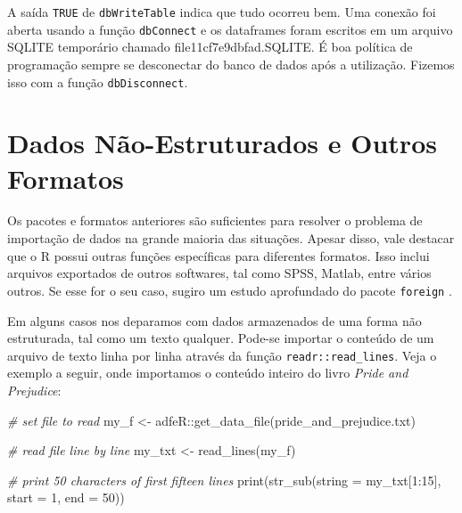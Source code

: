 \documentclass[
  11pt,
]{book}
\newenvironment{Shaded}{\begin{snugshade}}{\end{snugshade}}
\newcommand{\AttributeTok}[1]{\textcolor[rgb]{0.61,0.61,0.61}{#1}}
\newcommand{\CommentTok}[1]{\textcolor[rgb]{0.37,0.37,0.37}{\textit{#1}}}
\newcommand{\DecValTok}[1]{\textcolor[rgb]{0.06,0.06,0.06}{#1}}
\newcommand{\FunctionTok}[1]{\textcolor[rgb]{0,0,0}{#1}}
\newcommand{\NormalTok}[1]{#1}
\newcommand{\OtherTok}[1]{\textcolor[rgb]{0.37,0.37,0.37}{#1}}
\newcommand{\SpecialCharTok}[1]{\textcolor[rgb]{0,0,0}{#1}}
\newcommand{\StringTok}[1]{\textcolor[rgb]{0.5,0.5,0.5}{#1}}
\begin{document}
A saída \texttt{TRUE} de \texttt{dbWriteTable} indica que tudo ocorreu bem. Uma conexão foi aberta usando a função \texttt{dbConnect} e os dataframes foram escritos em um arquivo SQLITE temporário chamado file11cf7e9dbfad.SQLITE. É boa política de programação sempre se desconectar do banco de dados após a utilização. Fizemos isso com a função \texttt{dbDisconnect}.   

\hypertarget{dados-nuxe3o-estruturados-e-outros-formatos}{%
\section{Dados Não-Estruturados e Outros Formatos}\label{dados-nuxe3o-estruturados-e-outros-formatos}}

Os pacotes e formatos anteriores são suficientes para resolver o problema de importação de dados na grande maioria das situações. Apesar disso, vale destacar que o R possui outras funções específicas para diferentes formatos. Isso inclui arquivos exportados de outros softwares, tal como SPSS, Matlab, entre vários outros. Se esse for o seu caso, sugiro um estudo aprofundado do pacote \texttt{foreign} \citep{R-foreign}.

Em alguns casos nos deparamos com dados armazenados de uma forma não estruturada, tal como um texto qualquer. Pode-se importar o conteúdo de um arquivo de texto linha por linha através da função \texttt{readr::read\_lines}. Veja o exemplo a seguir, onde importamos o conteúdo inteiro do livro \emph{Pride and Prejudice}:

\begin{Shaded}
\begin{Highlighting}[]
\CommentTok{\# set file to read}
\NormalTok{my\_f }\OtherTok{\textless{}{-}}\NormalTok{ adfeR}\SpecialCharTok{::}\FunctionTok{get\_data\_file}\NormalTok{(}\StringTok{\textquotesingle{}pride\_and\_prejudice.txt\textquotesingle{}}\NormalTok{)}

\CommentTok{\# read file line by line}
\NormalTok{my\_txt }\OtherTok{\textless{}{-}} \FunctionTok{read\_lines}\NormalTok{(my\_f)}

\CommentTok{\# print 50 characters of first fifteen lines}
\FunctionTok{print}\NormalTok{(}\FunctionTok{str\_sub}\NormalTok{(}\AttributeTok{string =}\NormalTok{ my\_txt[}\DecValTok{1}\SpecialCharTok{:}\DecValTok{15}\NormalTok{], }
              \AttributeTok{start =} \DecValTok{1}\NormalTok{, }
              \AttributeTok{end =} \DecValTok{50}\NormalTok{))}
\end{Highlighting}
\end{Shaded}
\end{document}
